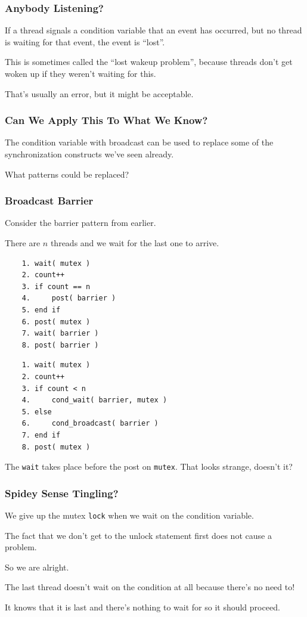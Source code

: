 \begin{frame}
\frametitle{Anybody Listening?}

If a thread signals a condition variable that an event has occurred, but no thread is waiting for that event, the event is ``lost''. 

This is sometimes called the ``lost wakeup problem'', because threads don't get woken up if they weren't waiting for this. 

That's usually an error, but it might be acceptable.

\end{frame}

\begin{frame}
\frametitle{Can We Apply This To What We Know?}

The condition variable with broadcast can be used to replace some of the synchronization constructs we've seen already. 

What patterns could be replaced?

\end{frame}

\begin{frame}[fragile]
\frametitle{Broadcast Barrier}

Consider the barrier pattern from earlier. 

There are $n$ threads and we wait for the last one to arrive.
{\scriptsize
\begin{multicols}{2}
  \begin{verbatim}
	1. wait( mutex )
	2. count++
	3. if count == n
	4.     post( barrier )
	5. end if
	6. post( mutex )
	7. wait( barrier )
	8. post( barrier )
  \end{verbatim}
\columnbreak
  \begin{verbatim}
	1. wait( mutex )
	2. count++
	3. if count < n
	4.     cond_wait( barrier, mutex )
	5. else 
	6.     cond_broadcast( barrier )
	7. end if
	8. post( mutex )
  \end{verbatim}
\end{multicols}
}

The \texttt{wait} takes place before the post on \texttt{mutex}. That looks strange, doesn't it?

\end{frame}


\begin{frame}
\frametitle{Spidey Sense Tingling?}


We give up the mutex \texttt{lock} when we wait on the condition variable.

The fact that we don't get to the unlock statement first does not cause a problem. 

So we are alright. 

The last thread doesn't wait on the condition at all because there's no need to!

It knows that it is last and there's nothing to wait for so it should proceed.

\end{frame}

